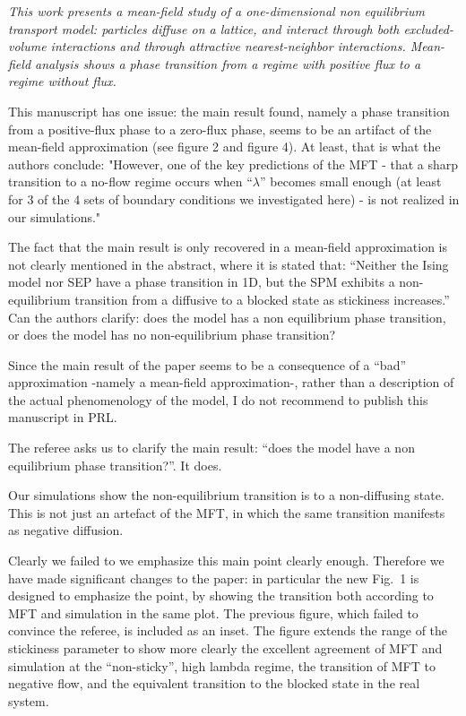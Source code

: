 \documentclass[a4paper,10pt]{article}
\begin{document}
   {\it This work presents a mean-field study of a one-dimensional non
   equilibrium transport model: particles diffuse on a lattice, and
   interact through both excluded-volume interactions and through
   attractive nearest-neighbor interactions. Mean-field analysis shows a
   phase transition from a regime with positive flux to a regime without
   flux.
  
   This manuscript has one issue: the main result found, namely a phase
   transition from a positive-flux phase to a zero-flux phase, seems to
   be an artifact of the mean-field approximation (see figure 2 and
   figure 4). At least, that is what the authors conclude: "However, one
   of the key predictions of the MFT - that a sharp transition to a
   no-flow regime occurs when ``$\lambda$'' becomes small enough (at least
   for 3 of the 4 sets of boundary conditions we investigated here) - is
   not realized in our simulations."
  
   The fact that the main result is only recovered in a mean-field
   approximation is not clearly mentioned in the abstract, where it is
   stated that: ``Neither the Ising model nor SEP have a phase transition
   in 1D, but the SPM exhibits a non-equilibrium transition from a
   diffusive to a blocked state as stickiness increases.'' Can the authors
   clarify: does the model has a non equilibrium phase transition, or
   does the model has no non-equilibrium phase transition?
  
   Since the main result of the paper seems to be a consequence of a
   ``bad'' approximation -namely a mean-field approximation-, rather
   than a description of the actual phenomenology of the model, I do not
   recommend to publish this manuscript in PRL.}




  The referee asks us to clarify the main result: ``does the model have a non equilibrium phase transition?''. 
  It does.
 
  Our simulations show the non-equilibrium transition is to a non-diffusing state.  
This is not just an artefact of the MFT, in which the same transition manifests as negative diffusion.
 
  Clearly we failed to we emphasize this main point clearly enough.
  Therefore we have made significant changes to the paper: in particular the
  new Fig.~1 is designed to emphasize the point, by showing the
  transition both according to MFT and simulation in the same plot.
  The previous figure, which failed to convince the referee, is
  included as an inset.  The figure extends the range of the
  stickiness parameter to show more clearly the excellent agreement of
  MFT and simulation at the ``non-sticky'', high lambda regime, the
  transition of MFT to negative flow, and the equivalent transition to
  the blocked state in the real system.
 
\end{document}
